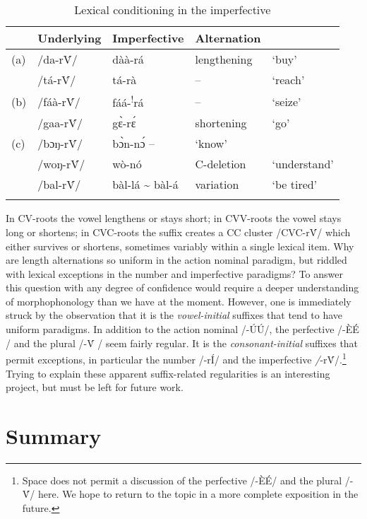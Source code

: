 \documentclass[output=paper,newtxmath,modfonts,nonflat,draftmode]{langsci/langscibook}
\begin{document}
\begin{table}
\begin{tabularx}{\textwidth}{lXXXX}
\lsptoprule
& {Underlying} & {Imperfective} & {Alternation} & \\
\midrule
(a) & /da-r\'{V}/ & dàà-rá & lengthening & ‘buy’\\
& /tá{}-r\'{V}/ & tá-rà & -- & ‘reach’\\
\tablevspace
(b) & /fáà-r\'{V}/ & fáá-\textsuperscript{!}rá & -- & ‘seize’\\
& /gaa{}-r\'{V}/ & gɛ̀-rɛ́ & shortening & ‘go’\\
\tablevspace
(c) & /bɔŋ-r\'{V}/ & bɔ̀n-nɔ́ -- & ‘know’\\
& /woŋ-r\'{V}/ & wò-nó & C-deletion & ‘understand’\\
& /bal-r\'{V}/ & bàl-lá {\textasciitilde} bàl-á & variation & ‘be tired’\\
\lspbottomrule
\end{tabularx}
\caption{Lexical conditioning in the imperfective}
\label{tab:anttila:15}
\end{table}\largerpage[2]

In CV-roots the vowel lengthens or stays short; in CVV-roots the vowel stays long or shortens; in CVC-roots the suffix creates a CC cluster /CVC-r\'{V}/ which either survives or shortens, sometimes variably within a single lexical item. Why are length alternations so uniform in the action nominal paradigm, but riddled with lexical exceptions in the number and imperfective paradigms? To answer this question with any degree of confidence would require a deeper understanding of  morphophonology than we have at the moment. However, one is immediately struck by the observation that it is the \textit{vowel-initial} suffixes that tend to have uniform paradigms. In addition to the action nominal /-\'{U}\'{U}/, the perfective /-\`{E}\'{E} / and the plural /-\'{V} / seem fairly regular. It is the \textit{consonant-initial} suffixes that permit exceptions, in particular the number /-rÍ/ and the imperfective \textit{/}{}-r\'{V}/.\footnote{Space does not permit a discussion of the perfective /-\`{E}É/ and the plural /-\'{V}/ here. We hope to return to the topic in a more complete exposition in the future.} Trying to explain these apparent suffix-related regularities is an interesting project, but must be left for future work.

\section{Summary}
\end{document}
